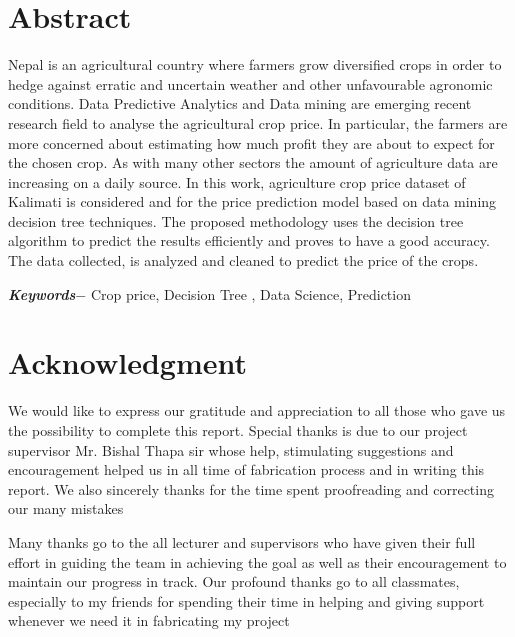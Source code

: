 \chapter*{Abstract} %
Nepal is an agricultural country where farmers grow diversified crops in order 
to hedge against erratic and uncertain weather and other unfavourable agronomic 
conditions. Data Predictive Analytics and Data mining are emerging recent research 
field to analyse the agricultural crop price. In particular, the farmers are more 
concerned about estimating how much profit they are about to expect for the chosen 
crop. As with many other sectors the amount of agriculture data are increasing on 
a daily source. In this work, agriculture crop price dataset of Kalimati is 
considered and for the price prediction model based on data mining decision 
tree techniques. The proposed methodology uses the decision tree algorithm 
to predict the results efficiently and proves to have a good accuracy. 
The data collected, is analyzed and cleaned to predict the price of the crops.
 
\par
\textbf{\textit{Keywords$-$}} Crop price, Decision Tree , Data Science, Prediction

\chapter*{Acknowledgment}
We would like to express our gratitude and appreciation to all those who 
gave us the possibility to complete this report. Special thanks is due to our project 
supervisor Mr. Bishal Thapa sir whose help, stimulating suggestions 
and encouragement helped us in all time of fabrication process and in writing 
this report. We also sincerely thanks for the time spent proofreading and correcting 
our many mistakes\par
Many thanks go to the all lecturer and supervisors who have given their 
full effort in guiding the team in achieving the goal as well as their 
encouragement to maintain our progress in track. Our profound thanks go to all 
classmates, especially to my friends for spending their time in helping and 
giving support whenever we need it in fabricating my project\par
\begin{flushright}
\vskip -20pt
\submittedBy
\end{flushright}

